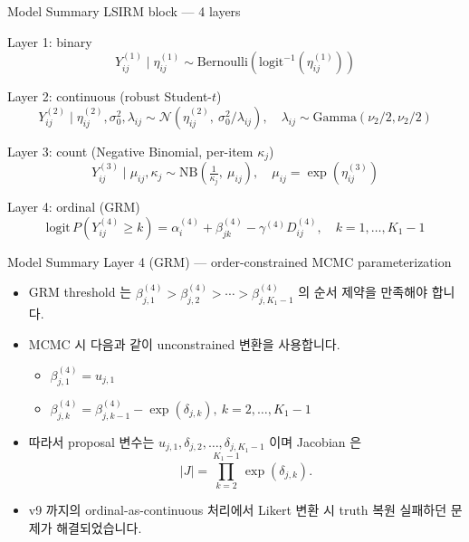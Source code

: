 \documentclass{beamer}
\begin{document}
\begin{frame}{Model Summary}
{LSIRM block --- 4 layers}

\begin{block}{Layer 1: binary}
\[
Y^{(1)}_{ij}\mid \eta^{(1)}_{ij} \sim \mathrm{Bernoulli}\!\left(\mathrm{logit}^{-1}\!\left(\eta^{(1)}_{ij}\right)\right)
\]
\end{block}

\begin{block}{Layer 2: continuous (robust Student-$t$)}
\[
Y^{(2)}_{ij}\mid \eta^{(2)}_{ij},\sigma_0^2,\lambda_{ij}
\sim \mathcal{N}\!\left(\eta^{(2)}_{ij},\ \sigma_0^2 / \lambda_{ij}\right),\quad
\lambda_{ij} \sim \mathrm{Gamma}(\nu_2/2,\nu_2/2)
\]
\end{block}

\begin{block}{Layer 3: count (Negative Binomial, per-item $\kappa_j$)}
\[
Y^{(3)}_{ij}\mid \mu_{ij},\kappa_j \sim \mathrm{NB}\!\left(\tfrac{1}{\kappa_j},\ \mu_{ij}\right),\quad
\mu_{ij} = \exp(\eta^{(3)}_{ij})
\]
\end{block}

\begin{block}{Layer 4: ordinal (GRM)}
\[
\mathrm{logit}\,P(Y^{(4)}_{ij}\ge k) = \alpha^{(4)}_i + \beta^{(4)}_{jk} - \gamma^{(4)} D^{(4)}_{ij},\quad k=1,\dots,K_1-1
\]
\end{block}
\end{frame}

\begin{frame}{Model Summary}
{Layer 4 (GRM) --- order-constrained MCMC parameterization}

\begin{itemize}
    \item GRM threshold 는 $\beta^{(4)}_{j,1} > \beta^{(4)}_{j,2} > \cdots > \beta^{(4)}_{j,K_1-1}$ 의 순서 제약을 만족해야 합니다.
    \item MCMC 시 다음과 같이 unconstrained 변환을 사용합니다.
    \begin{itemize}
        \item $\beta^{(4)}_{j,1} = u_{j,1}$
        \item $\beta^{(4)}_{j,k} = \beta^{(4)}_{j,k-1} - \exp(\delta_{j,k}),\ k=2,\dots,K_1-1$
    \end{itemize}
    \item 따라서 proposal 변수는 $u_{j,1},\delta_{j,2},\dots,\delta_{j,K_1-1}$ 이며 Jacobian 은
    \[
        |J| = \prod_{k=2}^{K_1-1} \exp(\delta_{j,k}).
    \]
    \item v9 까지의 ordinal-as-continuous 처리에서 Likert 변환 시 truth 복원 실패하던 문제가 해결되었습니다.
\end{itemize}
\end{frame}
\end{document}
